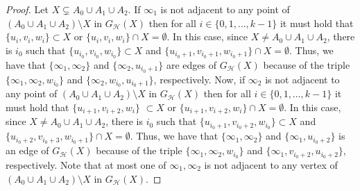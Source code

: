 \documentclass[11pt,a4paper]{article}
\begin{document}
\begin{proof}
    Let $X \subsetneq A_0 \cup A_1 \cup A_2$. If $\infty_1$ is not adjacent to any point of $(A_0 \cup A_1 \cup A_2) \setminus X$ in $G_{\mathcal{H}}(X)$ then for all $i \in \{ 0, 1, \ldots, k-1 \}$ it must hold that $\{ u_i, v_i, w_i \} \subset X$ or $\{ u_i, v_i, w_i \} \cap X = \emptyset$. In this case, since $X \neq A_0 \cup A_1 \cup A_2$, there is $i_0$ such that $\{ u_{i_0}, v_{i_0}, w_{i_0} \} \subset X$ and $\{ u_{i_0+1}, v_{i_0+1}, w_{i_0+1} \} \cap X = \emptyset$. Thus, we have that $\{ \infty_1, \infty_2 \}$ and $\{ \infty_2, u_{i_0+1} \} $ are edges of $G_{\mathcal{H}}(X)$ because of the triple $\{ \infty_1, \infty_2, w_{i_0} \}$ and $\{ \infty_2, w_{i_0} , u_{i_0+1} \}$, respectively. Now, if $\infty_2$ is not adjacent to any point of $(A_0 \cup A_1 \cup A_2) \setminus X$ in $G_{\mathcal{H}}(X)$ then for all $i \in \{ 0, 1, \ldots, k-1 \}$ it must hold that $\{ u_{i+1}, v_{i+2}, w_i \}$ $\subset X$ or $\{ u_{i+1}, v_{i+2}, w_i \} \cap X = \emptyset$. In this case, since $X \neq A_0 \cup A_1 \cup A_2$, there is $i_0$ such that $\{ u_{i_0 + 1}, v_{i_0 + 2}, w_{i_0} \} \subset X$ and $\{ u_{i_0+2}, v_{i_0+3}, w_{i_0+1} \} \cap X = \emptyset$. Thus, we have that $\{ \infty_1, \infty_2 \}$ and $\{ \infty_1, u_{i_0+2} \} $ is an edge of $G_{\mathcal{H}}(X)$ because of the triple $\{ \infty_1, \infty_2, w_{i_0} \}$ and $\{ \infty_1, v_{i_0+2} , u_{i_0+2} \}$, respectively. Note that at most one of $\infty_1, \infty_2$ is not adjacent to any vertex of $(A_0 \cup A_1 \cup A_2) \setminus X$ in $G_\mathcal{H}(X)$.
\end{proof}




\end{document}
